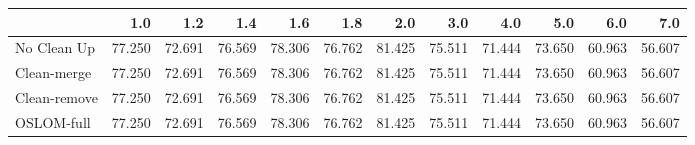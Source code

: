 \begin{tabular}{lrrrrrrrrrrr}
\toprule
{} &    1.0 &    1.2 &    1.4 &    1.6 &    1.8 &    2.0 &    3.0 &    4.0 &    5.0 &    6.0 &    7.0 \\
\midrule
No Clean Up  & 77.250 & 72.691 & 76.569 & 78.306 & 76.762 & 81.425 & 75.511 & 71.444 & 73.650 & 60.963 & 56.607 \\
Clean-merge  & 77.250 & 72.691 & 76.569 & 78.306 & 76.762 & 81.425 & 75.511 & 71.444 & 73.650 & 60.963 & 56.607 \\
Clean-remove & 77.250 & 72.691 & 76.569 & 78.306 & 76.762 & 81.425 & 75.511 & 71.444 & 73.650 & 60.963 & 56.607 \\
OSLOM-full   & 77.250 & 72.691 & 76.569 & 78.306 & 76.762 & 81.425 & 75.511 & 71.444 & 73.650 & 60.963 & 56.607 \\
\bottomrule
\end{tabular}
